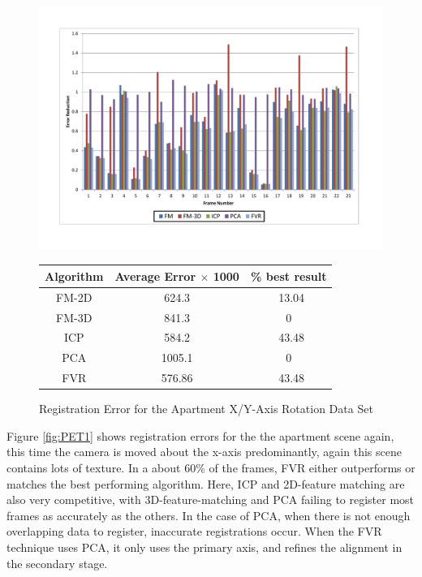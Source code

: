 \begin{figure}
\centering
\includegraphics[width=6in]{images/results/Apartment_Texture_Rotate_XAxis}
\caption{Registration Error for the Apartment X/Y-Axis Rotation Data Set}
\label{fig:PET1}

\begin{tabular}{ccc}
\hline
\textbf{Algorithm} & \textbf{Average Error $\times$ 1000} & \textbf{\% best result}\\ \hline
FM-2D	& 624.3 & ~13.04\\
FM-3D	& 841.3 & 0\\
ICP		& 584.2 & ~43.48\\
PCA		& 1005.1 & 0\\
FVR		& 576.86 & ~43.48\\
\end{tabular}
\label{tab:PET1ST}
\end{figure} 



Figure \ref{fig:PET1} shows registration errors for the the apartment scene again, this time the camera is moved about the x-axis predominantly, again this scene contains lots of texture. In a about 60\% of the frames, FVR either outperforms or matches the best performing algorithm. Here, ICP and 2D-feature matching are also very competitive, with 3D-feature-matching and PCA failing to register most frames as accurately as the others. In the case of PCA, when there is not enough overlapping data to register, inaccurate registrations occur. When the FVR technique uses PCA, it only uses the primary axis, and refines the alignment in the secondary stage. \\


